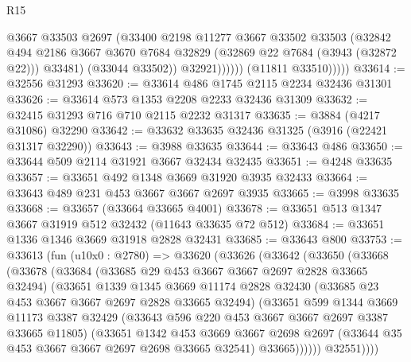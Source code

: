 \begin{lexlean}{R15}
\begin{coremodule}
                        @3667
                        @33503
                        @2697
                        (@33400
                          @2198
                          @11277
                          @3667
                          @33502
                          @33503
                          (@32842
                            @494
                            @2186
                            @3667
                            @3670
                            @7684
                            @32829
                            (@32869 @22 @7684 (@3943 (@32872 @22)))
                            @33481)
                          (@33044 @33502))
                        @32921))))))
            (@11811 @33510)))))
@33614 := @32556 @31293
@33620 := @33614 @486 @1745 @2115 @2234 @32436 @31301
@33626 := @33614 @573 @1353 @2208 @2233 @32436 @31309
@33632 := @32415 @31293 @716 @710 @2115 @2232 @31317
@33635 := @3884 (@4217 @31086) @32290
@33642 := @33632 @33635 @32436 @31325 (@3916 (@22421 @31317 @32290))
@33643 := @3988 @33635
@33644 := @33643 @486
@33650 := @33644 @509 @2114 @31921 @3667 @32434 @32435
@33651 := @4248 @33635
@33657 := @33651 @492 @1348 @3669 @31920 @3935 @32433
@33664 := @33643 @489 @231 @453 @3667 @3667 @2697 @3935
@33665 := @3998 @33635
@33668 := @33657 (@33664 @33665 @4001)
@33678 := @33651 @513 @1347 @3667 @31919 @512 @32432 (@11643 @33635 @72 @512)
@33684 := @33651 @1336 @1346 @3669 @31918 @2828 @32431
@33685 := @33643 @800
@33753 := @33613
    (fun (u10x0 : @2780) =>
    @33620
      (@33626
        (@33642
          (@33650
            (@33668
              (@33678
                (@33684
                  (@33685 @29 @453 @3667 @3667 @2697 @2828 @33665 @32494)
                  (@33651
                    @1339
                    @1345
                    @3669
                    @11174
                    @2828
                    @32430
                    (@33685 @23 @453 @3667 @3667 @2697 @2828 @33665 @32494)
                    (@33651
                      @599
                      @1344
                      @3669
                      @11173
                      @3387
                      @32429
                      (@33643 @596 @220 @453 @3667 @3667 @2697 @3387 @33665 @11805)
                      (@33651
                        @1342
                        @453
                        @3669
                        @3667
                        @2698
                        @2697
                        (@33644 @35 @453 @3667 @3667 @2697 @2698 @33665 @32541)
                        @33665))))))
            @32551))))

\end{coremodule}
\end{lexlean}
